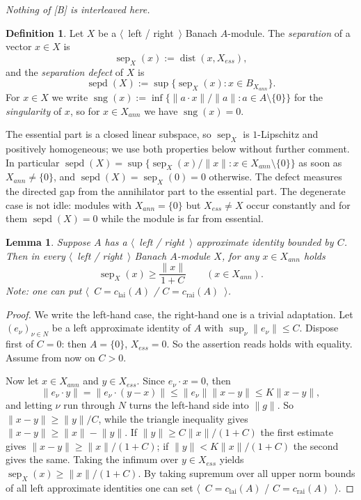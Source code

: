 \documentclass[11pt]{article}
\theoremstyle{plain}
\newtheorem{lemma}[theorem]{Lemma}
\theoremstyle{definition}
\newtheorem{definition}[theorem]{Definition}
\DeclareMathOperator{\dist}{dist}
\DeclareMathOperator{\sep}{sep}
\DeclareMathOperator{\sepd}{sepd}
\DeclareMathOperator{\sng}{sng}
\newcommand{\crai}{c_{\mathrm{rai}}}
\newcommand{\clai}{c_{\mathrm{lai}}}
\begin{document}
\emph{Nothing of [B] is interleaved here.}

\begin{definition}\label{SepOfMod}
Let $X$ be a $\langle$~left / right~$\rangle$ Banach $A$-module. 
The \emph{separation} of a vector
$x\in X$ is
\[
\sep_X(x):=\dist(x,X_{ess}),
\]
and the \emph{separation defect} of $X$ is
\[
\sepd(X):=\sup \{\sep_X(x):x\in B_{X_{ann}} \}.
\]
For $x\in X$ we write
$\sng(x):=\inf \{\lVert a\cdot x\rVert/\lVert a\rVert:a\in A\setminus \{0 \} \}$
for the \emph{singularity} of $x$, so for $x\in X_{ann}$ we have
$\sng(x)=0$.
\end{definition}

The essential part is a closed linear subspace, so $\sep_X$ is $1$-Lipschitz and
positively homogeneous; we use both properties below without further comment. In
particular
$\sepd(X)=\sup \{\sep_X(x)/\lVert x\rVert:x\in X_{ann}\setminus \{0 \} \}$ as
soon as $X_{ann}\neq \{0 \}$, and $\sepd(X)=\sep_X(0)=0$ otherwise. The defect
measures the directed gap from the annihilator part to the essential part. The 
degenerate case is not idle: modules with $X_{ann}= \{0 \}$ but $X_{ess}\neq X$ 
occur constantly and for them $\sepd(X)=0$ while the module is far from 
essential.

\begin{lemma}\label{SepLowerBound}
Suppose $A$ has a $\langle$~left / right~$\rangle$ approximate identity bounded
by $C$. Then in every $\langle$~left / right~$\rangle$ Banach $A$-module $X$, 
for any $x\in X_{ann}$ holds
\[
\sep_X(x)\geq\frac{\lVert x\rVert}{1+C}\qquad(x\in X_{ann}).
\]
Note: one can put $\langle$~$C=\clai(A)$ / $C=\crai(A)$~$\rangle$.
\end{lemma}

\begin{proof} 
We write the left-hand case, the right-hand one is a trivial adaptation. 
Let ${(e_\nu)}_{\nu\in N}$ be a left approximate identity of $A$ 
with $\sup_\nu\lVert e_\nu\rVert\leq C$. Dispose 
first of $C=0$: then $A=\{0\}$, $X_{ess}=0$. So the assertion reads holds with 
equality. Assume from now on $C>0$.

Now let $x\in X_{ann}$ and $y\in X_{ess}$. Since $e_\nu\cdot x=0$, then
\[
\lVert e_\nu\cdot y\rVert=\lVert e_\nu\cdot(y-x)\rVert
\leq\lVert e_\nu\rVert\lVert x-y\rVert\leq K\lVert x-y\rVert ,
\]
and letting $\nu$ run through $N$ turns the left-hand side into $\lVert g\rVert$. 
So $\lVert x-y\rVert\geq\lVert y\rVert/C$, while the triangle inequality gives
$\lVert x-y\rVert\geq\lVert x\rVert-\lVert y\rVert$. If
$\lVert y\rVert\geq C\lVert x\rVert/(1+C)$ the first estimate gives
$\lVert x-y\rVert\geq\lVert x\rVert/(1+C)$; if
$\lVert y\rVert<K\lVert x\rVert/(1+C)$ the second gives the same. Taking the
infimum over $y\in X_{ess}$ yields $\sep_X(x)\geq\lVert x\rVert/(1+C)$. By taking 
supremum over all upper norm bounds of all left approximate identities 
one can set $\langle$~$C=\clai(A)$ / $C=\crai(A)$~$\rangle$.
\end{proof}
\end{document}
